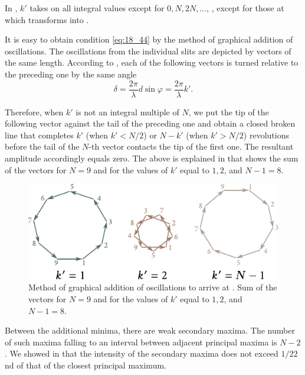 \noindent
In , $k'$ takes on all integral values except for $0, N, 2N, \ldots$, \ie, except for those at which  transforms into
.

It is easy to obtain condition \eqref{eq:18_44} by the method of graphical addition of oscillations.
The oscillations from the individual slits are depicted by vectors of the same length.
According to , each of the following vectors is turned relative to the preceding one by the same angle
\begin{equation*}
	\delta = \frac{2\pi}{\lambda} d\sin\varphi = \frac{2\pi}{\lambda} k'.
\end{equation*}

\noindent
Therefore, when $k'$ is not an integral multiple of $N$, we put the tip of the following vector against the tail of the preceding one and obtain a closed broken line that completes $k'$ (when $k'<N/2$) or $N-k'$ (when $k'>N/2$) revolutions before the tail of the $N$-th vector contacts the tip of the first one.
The resultant amplitude accordingly equals zero. The above is explained in  that shows the sum of the vectors for $N=9$ and for the values of $k'$ equal to $1, 2$, and $N-1=8$.

\begin{figure}[t]
	\begin{center}
		\includegraphics[scale=0.95]{figures/ch_18/fig_18_33.pdf}
        \caption[]{Method of graphical addition of oscillations to arrive at . Sum of the vectors for $N = 9$ and for the values of $k'$ equal to $1, 2$, and $N-1= 8$.}
		\label{fig:18_33}
	\end{center}
	\vspace{-0.7cm}
\end{figure}

Between the additional minima, there are weak secondary maxima.
The number of such maxima falling to an interval between adjacent principal maxima is $N-2$.
We showed in  that the intensity of the secondary maxima does not exceed $1/22$nd of that of the closest principal maximum.

